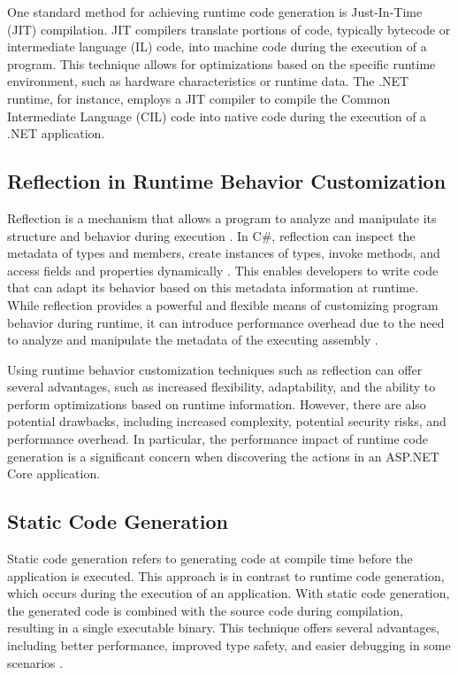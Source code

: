 One standard method for achieving runtime code generation is Just-In-Time (JIT) compilation. JIT compilers translate portions of code, typically bytecode or intermediate language (IL) code, into machine code during the execution of a program\cite{Aycock2003}. This technique allows for optimizations based on the specific runtime environment, such as hardware characteristics or runtime data\cite{Gal2006}. The .NET runtime, for instance, employs a JIT compiler to compile the Common Intermediate Language (CIL) code into native code during the execution of a .NET application\cite{Esposito2014}.

\subsection{Reflection in Runtime Behavior Customization}

Reflection is a mechanism that allows a program to analyze and manipulate its structure and behavior during execution \cite{Maes1987}. In C\#, reflection can inspect the metadata of types and members, create instances of types, invoke methods, and access fields and properties dynamically \cite{Albahari2019}. This enables developers to write code that can adapt its behavior based on this metadata information at runtime. While reflection provides a powerful and flexible means of customizing program behavior during runtime, it can introduce performance overhead due to the need to analyze and manipulate the metadata of the executing assembly \cite{Skeet2019, Tudose2013}.

Using runtime behavior customization techniques such as reflection can offer several advantages, such as increased flexibility, adaptability, and the ability to perform optimizations based on runtime information\cite{Chiba1995, Aycock2003}. However, there are also potential drawbacks, including increased complexity, potential security risks, and performance overhead\cite{Aycock2003, Pobar2005, Tudose2013}. In particular, the performance impact of runtime code generation is a significant concern when discovering the actions in an ASP.NET Core application.

\subsection{Static Code Generation}

Static code generation refers to generating code at compile time before the application is executed. This approach is in contrast to runtime code generation, which occurs during the execution of an application. With static code generation, the generated code is combined with the source code during compilation, resulting in a single executable binary. This technique offers several advantages, including better performance, improved type safety, and easier debugging in some scenarios \cite{Chiba2000}.

